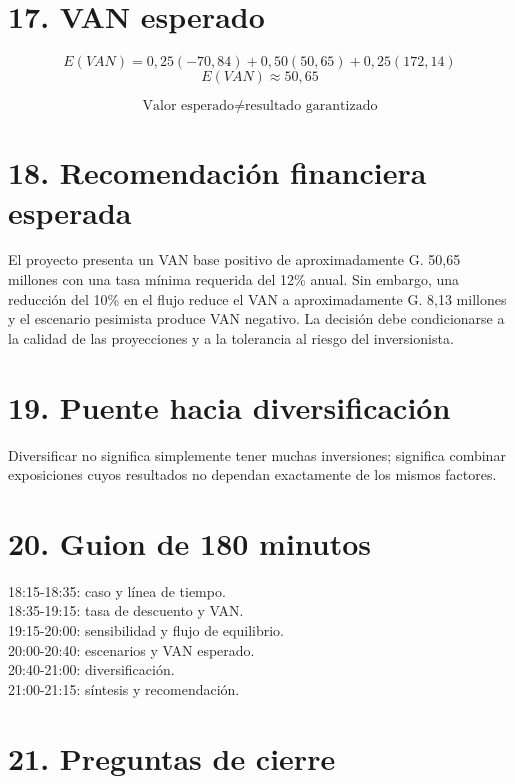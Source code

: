 \documentclass[11pt,a4paper]{article}
\begin{document}
\section*{17. VAN esperado}

\[
E(VAN)=0{,}25(-70{,}84)+0{,}50(50{,}65)+0{,}25(172{,}14)
\]
\[
E(VAN)\approx 50{,}65
\]

\[
\boxed{\text{Valor esperado} \neq \text{resultado garantizado}}
\]

\section*{18. Recomendación financiera esperada}

El proyecto presenta un VAN base positivo de aproximadamente G. 50,65 millones con una tasa mínima requerida del 12\% anual. Sin embargo, una reducción del 10\% en el flujo reduce el VAN a aproximadamente G. 8,13 millones y el escenario pesimista produce VAN negativo. La decisión debe condicionarse a la calidad de las proyecciones y a la tolerancia al riesgo del inversionista.

\section*{19. Puente hacia diversificación}

Diversificar no significa simplemente tener muchas inversiones; significa combinar exposiciones cuyos resultados no dependan exactamente de los mismos factores.

\section*{20. Guion de 180 minutos}

18:15-18:35: caso y línea de tiempo.\\
18:35-19:15: tasa de descuento y VAN.\\
19:15-20:00: sensibilidad y flujo de equilibrio.\\
20:00-20:40: escenarios y VAN esperado.\\
20:40-21:00: diversificación.\\
21:00-21:15: síntesis y recomendación.

\section*{21. Preguntas de cierre}
\end{document}
